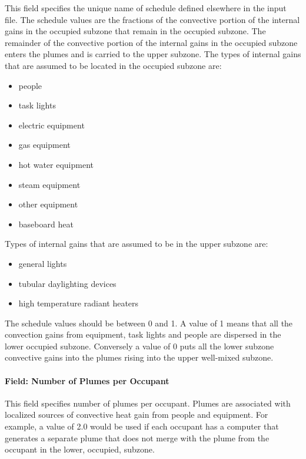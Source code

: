 This field specifies the unique name of schedule defined elsewhere in the input file. The schedule values are the fractions of the convective portion of the internal gains in the occupied subzone that remain in the occupied subzone. The remainder of the convective portion of the internal gains in the occupied subzone enters the plumes and is carried to the upper subzone. The types of internal gains that are assumed to be located in the occupied subzone are:

\begin{itemize}
\item
  people
\item
  task lights
\item
  electric equipment
\item
  gas equipment
\item
  hot water equipment
\item
  steam equipment
\item
  other equipment
\item
  baseboard heat
\end{itemize}

Types of internal gains that are assumed to be in the upper subzone are:

\begin{itemize}
\item
  general lights
\item
  tubular daylighting devices
\item
  high temperature radiant heaters
\end{itemize}

The schedule values should be between 0 and 1. A value of 1 means that all the convection gains from equipment, task lights and people are dispersed in the lower occupied subzone. Conversely a value of 0 puts all the lower subzone convective gains into the plumes rising into the upper well-mixed subzone.

\paragraph{Field: Number of Plumes per Occupant}\label{field-number-of-plumes-per-occupant}

This field specifies number of plumes per occupant. Plumes are associated with localized sources of convective heat gain from people and equipment. For example, a value of 2.0 would be used if each occupant has a computer that generates a separate plume that does not merge with the plume from the occupant in the lower, occupied, subzone.

